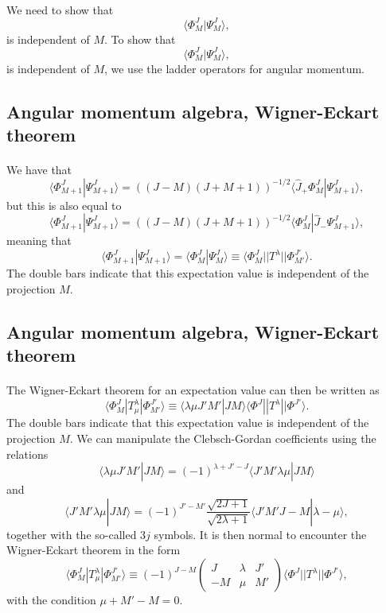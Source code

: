\documentclass[%
twoside,                 %
final,                   %
10pt]{article}
\begin{document}
\paragraph{}
We need to show that 
\[
\langle \Phi^J_M|\Psi^{J}_{M}\rangle,
\]
is independent of $M$.
To show that 
\[
\langle \Phi^J_M|\Psi^{J}_{M}\rangle,
\]
is independent of $M$, we use the ladder operators for angular momentum.



\subsection{Angular momentum algebra, Wigner-Eckart theorem}

\paragraph{}
 We have that
\[
\langle \Phi^J_{M+1}|\Psi^{J}_{M+1}\rangle=\left((J-M)(J+M+1)\right)^{-1/2}\langle \hat{J}_{+}\Phi^J_{M}|\Psi^{J}_{M+1}\rangle,
\]
but this is also equal to 
\[
\langle \Phi^J_{M+1}|\Psi^{J}_{M+1}\rangle=\left((J-M)(J+M+1)\right)^{-1/2}\langle \Phi^J_{M}|\hat{J}_{-}\Psi^{J}_{M+1}\rangle,
\]
meaning that
\[
\langle \Phi^J_{M+1}|\Psi^{J}_{M+1}\rangle=\langle \Phi^J_M|\Psi^{J}_{M}\rangle\equiv\langle \Phi^J_{M}||T^{\lambda}||\Phi^{J'}_{M'}\rangle.
\]
The double bars indicate that this expectation value is independent of the projection $M$.



\subsection{Angular momentum algebra, Wigner-Eckart theorem}

\paragraph{}
The Wigner-Eckart theorem for an expectation value can then be written as 
\[
\langle \Phi^J_M|T^{\lambda}_{\mu}|\Phi^{J'}_{M'}\rangle\equiv\langle \lambda \mu J'M'|JM\rangle\langle \Phi^J||T^{\lambda}||\Phi^{J'}\rangle.
\]
The double bars indicate that this expectation value is independent of the projection $M$.
We can manipulate the Clebsch-Gordan coefficients using the relations
\[
\langle \lambda \mu J'M'|JM\rangle= (-1)^{\lambda+J'-J}\langle J'M'\lambda \mu |JM\rangle 
\]
and
\[
\langle J'M'\lambda \mu |JM\rangle =(-1)^{J'-M'}\frac{\sqrt{2J+1}}{\sqrt{2\lambda+1}}\langle J'M'J-M |\lambda-\mu\rangle,
\]
together with the so-called $3j$ symbols.
It is then normal to encounter the Wigner-Eckart theorem in the form 
\[
\langle \Phi^J_M|T^{\lambda}_{\mu}|\Phi^{J'}_{M'}\rangle\equiv(-1)^{J-M}\left(\begin{array}{ccc}  J & \lambda & J' \\ -M & \mu & M'\end{array}\right)\langle \Phi^J||T^{\lambda}||\Phi^{J'}\rangle,
\]
with the condition $\mu+M'-M=0$.
\end{document}
